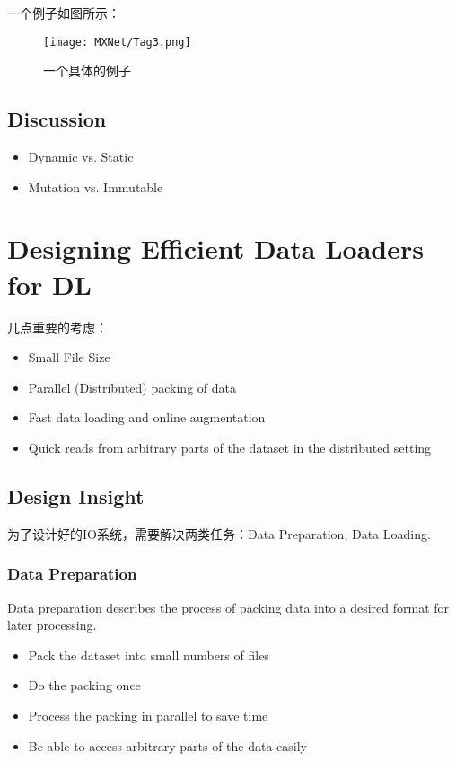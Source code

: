 一个例子如图所示：
\begin{figure}[!hbtp]
\centering
\texttt{[image: MXNet/Tag3.png]}
\caption{一个具体的例子}
\label{Tag3.png}
\end{figure}

\subsection{Discussion}

\begin{itemize}
\item Dynamic vs. Static
\item Mutation vs. Immutable
\end{itemize}

\section{Designing Efficient Data Loaders for DL}

几点重要的考虑：
\begin{itemize}
\item Small File Size
\item Parallel (Distributed) packing of data
\item Fast data loading and online augmentation
\item Quick reads from arbitrary parts of the dataset in the distributed setting
\end{itemize}

\subsection{Design Insight}

为了设计好的IO系统，需要解决两类任务：Data Preparation, Data Loading.

\subsubsection{Data Preparation}

Data preparation describes the process of packing data into a desired format for later processing. 

\begin{itemize}
\item Pack the dataset into small numbers of files
\item Do the packing once
\item Process the packing in parallel to save time
\item Be able to access arbitrary parts of the data easily
\end{itemize}

